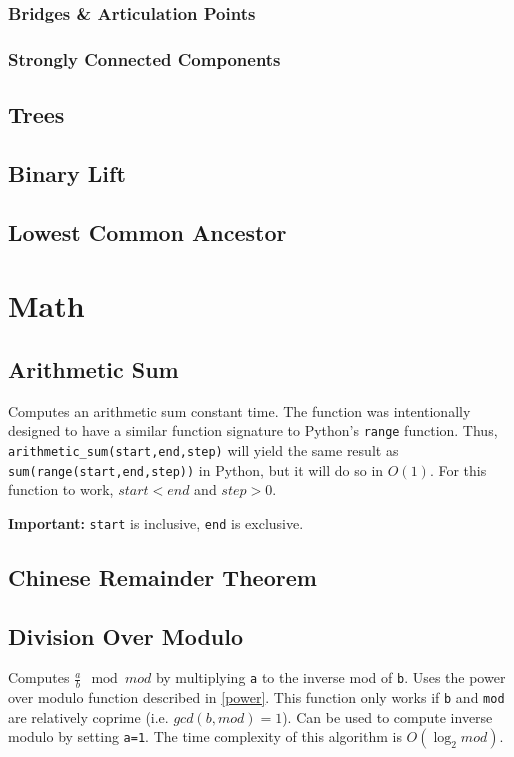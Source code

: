 \documentclass[letterpaper,11pt,twoside]{article}
\begin{document}
                \subsubsection{Bridges \& Articulation Points}
                \subsubsection{Strongly Connected Components}
            \subsection{Trees}
                \subsection{Binary Lift}
                \subsection{Lowest Common Ancestor}

        \section{Math}
            \subsection{Arithmetic Sum}
                Computes an arithmetic sum constant time.
                The function was intentionally designed to have a similar function signature to Python's \verb|range| function.
                Thus, \verb|arithmetic_sum(start,end,step)| will yield the same result as \verb|sum(range(start,end,step))| in Python, but it will do so in $O(1)$.
                For this function to work, $start < end$ and $step > 0$.

                \textbf{Important:} \verb|start| is inclusive, \verb|end| is exclusive.
                
                
            \subsection{Chinese Remainder Theorem}
            \subsection{Division Over Modulo}
                Computes $\frac{a}{b} \mod mod$ by multiplying \verb|a| to the inverse mod of \verb|b|.
                Uses the power over modulo function described in \ref{power}.
                This function only works if \verb|b| and \verb|mod| are relatively coprime (i.e. $gcd(b,mod) = 1$).
                Can be used to compute inverse modulo by setting \verb|a=1|.
                The time complexity of this algorithm is $O(\log_2{mod})$.
                
                
\end{document}

